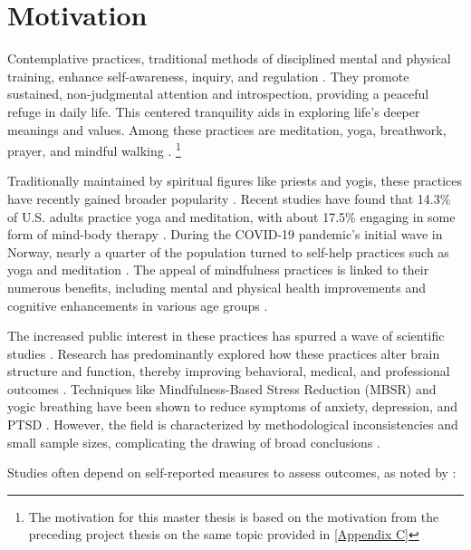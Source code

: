 

\section{Motivation}
Contemplative practices, traditional methods of disciplined mental and physical training, enhance self-awareness, inquiry, and regulation \cite{Davidson2017VarietiesOC}. They promote sustained, non-judgmental attention and introspection, providing a peaceful refuge in daily life. This centered tranquility aids in exploring life's deeper meanings and values. Among these practices are meditation, yoga, breathwork, prayer, and mindful walking \cite{Bruce2018ContemplativePP}. \footnote{The motivation for this master thesis is based on the motivation from the preceding project thesis on the same topic provided in \autoref{Appendix C}}

Traditionally maintained by spiritual figures like priests and yogis, these practices have recently gained broader popularity \cite{Brandmeyer2021MeditationAT}. Recent studies have found that 14.3\% of U.S. adults practice yoga and meditation, with about 17.5\% engaging in some form of mind-body therapy \cite{14USA}\cite{33USA}. During the COVID-19 pandemic's initial wave in Norway, nearly a quarter of the population turned to self-help practices such as yoga and meditation \cite{Norge}. The appeal of mindfulness practices is linked to their numerous benefits, including mental and physical health improvements and cognitive enhancements in various age groups \cite{happyreinforcment}\cite{agecognition}.

The increased public interest in these practices has spurred a wave of scientific studies \cite{Brandmeyer2021MeditationAT}. Research has predominantly explored how these practices alter brain structure and function, thereby improving behavioral, medical, and professional outcomes \cite{Brandmeyer2021MeditationAT}. Techniques like Mindfulness-Based Stress Reduction (MBSR) and yogic breathing have been shown to reduce symptoms of anxiety, depression, and PTSD \cite{metamindfullnes}\cite{yogabreathing}. However, the field is characterized by methodological inconsistencies and small sample sizes, complicating the drawing of broad conclusions \cite{metamindfullnes}.

Studies often depend on self-reported measures to assess outcomes, as noted by \cite{deconReconSelf}:

